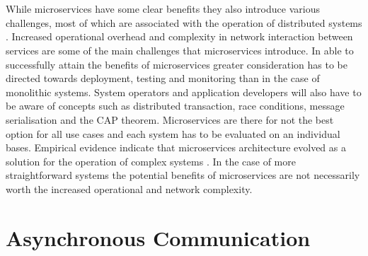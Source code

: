 \\ \\
While microservices have some clear benefits they also introduce various challenges, most of which are associated with the operation of distributed systems \cite{deutsch2004eight}. Increased operational overhead and complexity in network interaction between services are some of the main challenges that microservices introduce. In able to successfully attain the benefits of microservices greater consideration has to be directed towards deployment, testing and monitoring than in the case of monolithic systems. System operators and application developers will also have to be aware of concepts such as distributed transaction, race conditions, message serialisation and the CAP theorem. Microservices are there for not the best option for all use cases and each system has to be evaluated on an individual bases. Empirical evidence indicate that microservices architecture evolved as a solution for the operation of complex systems \cite{thones2015microservices, microservicesNetflix}. In the case of more straightforward systems the potential benefits of microservices are not necessarily worth the increased operational and network complexity.

\section{Asynchronous Communication}

